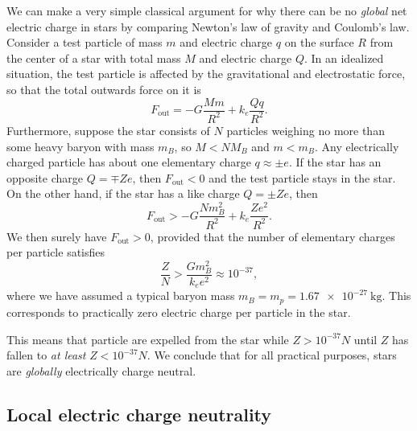 We can make a very simple classical argument for why there can be no \emph{global} net electric charge in stars by comparing Newton's law of gravity and Coulomb's law.
Consider a test particle of mass $m$ and electric charge $q$ on the surface $R$ from the center of a star with total mass $M$ and electric charge $Q$.
In an idealized situation, the test particle is affected by the gravitational and electrostatic force, so that the total outwards  force on it is
\begin{equation}
	F_\text{out} = -G \frac{M m}{R^2} + k_e \frac{Q q}{R^2} .
\end{equation}
Furthermore, suppose the star consists of $N$ particles weighing  no more than some heavy baryon with mass $m_B$, so $M < N M_B$ and $m < m_B$.
Any electrically charged particle has about one elementary charge $q \approx \pm e$.
If the star has an opposite charge $Q = \mp Z e$, then $F_\text{out} < 0$ and the test particle stays in the star.
On the other hand, if the star has a like charge $Q = \pm Z e$, then
\begin{equation}
	F_\text{out} > -G \frac{N m_B^2}{R^2} + k_e \frac{Z e^2}{R^2} .
\end{equation}
We then surely have $F_\text{out} > 0$, provided that the number of elementary charges per particle satisfies
\begin{equation}
	\frac{Z}{N} > \frac{G m_B^2}{k_e e^2} \approx 10^{-37} ,
\end{equation}
where we have assumed a typical baryon mass $m_B = m_p = \SI{1.67e-27}{\kilogram}$.
This corresponds to practically zero electric charge per particle in the star.

This means that particle are expelled from the star while $Z > 10^{-37} N$ until $Z$ has fallen to \emph{at least} $Z < 10^{-37} N$.
We conclude that for all practical purposes, stars are \emph{globally} electrically charge neutral.





\subsection{Local electric charge neutrality}

